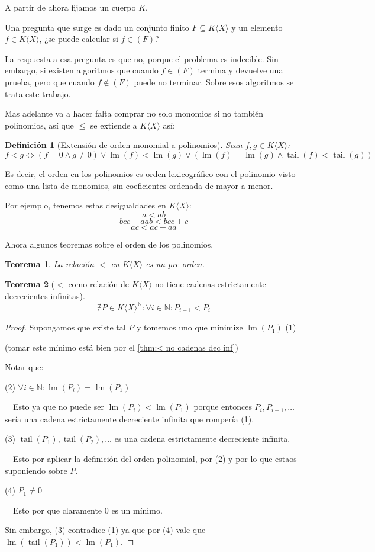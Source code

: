 \documentclass{amsbook} %
\theoremstyle{customstyle}
\newtheorem{definition}{Definición}[section]
\newtheorem{theorem}{Teorema}[section]
\DeclareMathOperator{\lm}{lm}
\DeclareMathOperator{\tail}{tail}
\begin{document}
A partir de ahora fijamos un cuerpo $K$.

Una pregunta que surge es dado un conjunto finito $F ⊆ K⟨X⟩$ y un elemento $f ∈ K⟨X⟩$, ¿se puede calcular si $f ∈ (F)$?

La respuesta a esa pregunta es que no, porque el problema es indecible. Sin embargo, si existen algoritmos que cuando $f ∈ (F)$ termina y devuelve una prueba, pero que cuando $f ∉ (F)$ puede no terminar. Sobre esos algoritmos se trata este trabajo.

Mas adelante va a hacer falta comprar no solo monomios si no también polinomios, así que $≤$ se extiende a $K⟨X⟩$ así:

\begin{definition}[Extensión de orden monomial a polinomios]
Sean $f, g ∈  K⟨X⟩$:
\[ f < g ⇔ (f = 0 ∧ g ≠ 0) ∨ \lm(f) < \lm(g) ∨ (\lm(f) = \lm(g) ∧ \tail(f) < \tail(g)) \]
\end{definition}

Es decir, el orden en los polinomios es orden lexicográfico con el polinomio visto como una lista de monomios, sin coeficientes ordenada de mayor a menor.

Por ejemplo, tenemos estas desigualdades en $K⟨X⟩$:
\[ a < ab \]
\[ bcc + aab < bcc + c \]
\[ ac < ac + aa \]

Ahora algunos teoremas sobre el orden de los polinomios.

\begin{theorem} La relación $<$ en $K⟨X⟩$ es un pre-orden.
\end{theorem}

\begin{theorem}[$<$ como relación de $K⟨X⟩$ no tiene cadenas estrictamente decrecientes infinitas]\label{thm:< en KX no cadenas dec inf}
\[ ∄P ∈ K⟨X⟩^ℕ : ∀i ∈ ℕ : P_{i + 1} < P_i \] %
\end{theorem}
\begin{proof}
Supongamos que existe tal $P$ y tomemos uno que minimize $\lm(P_1)$ (1)

(tomar este mínimo está bien por el \cref{thm:< no cadenas dec inf})

Notar que:

(2) $∀i ∈ ℕ : \lm(P_i) = \lm(P_1)$

  Esto ya que no puede ser $\lm(P_i) < \lm(P_1)$ porque entonces $P_i, P_{i + 1}, …$ sería una cadena estrictamente decreciente infinita que rompería (1).


(3) $\tail(P_1), \tail(P_2), …$ es una cadena estrictamente decreciente infinita.

  Esto por aplicar la definición del orden polinomial, por (2) y por lo que estaos suponiendo sobre $P$.

(4) $P_1 ≠ 0$

  Esto por que claramente $0$ es un mínimo.

Sin embargo, (3) contradice (1) ya que por (4) vale que $\lm(\tail(P_1)) < \lm(P_1)$.

\end{proof}
\end{document}
